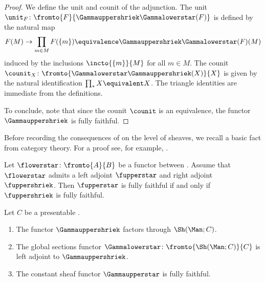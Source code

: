 \begin{proof}
	We define the unit and counit of the adjunction.
	The unit $ \unit_{F} \colon \fromto{F}{\Gammauppershriek \Gammalowerstar(F)} $ is defined by the natural map
	\begin{equation*}
		F(M) \to \prod_{m \in M} F(\{m\}) \equivalence \Gammauppershriek \Gammalowerstar(F)(M)
	\end{equation*}
	induced by the inclusions $ \incto{\{m\}}{M} $ for all $ m \in M $.
	The counit $ \counit_X \colon \fromto{\Gammalowerstar \Gammauppershriek(X)}{X} $ is given by the natural identification $ \prod_{*} X \equivalent X $.
	The triangle identities are immediate from the definitions.

	To conclude, note that since the counit $ \counit $ is an equivalence, the functor $ \Gammauppershriek $ is fully faithful.
\end{proof}

Before recording the consequences of  on the level of sheaves, we recall a basic fact from category theory.
For a proof see, for example, \cite[Chapter VII, \S4, Lemma 1]{MR1300636}.

\begin{lemma}\label{lem:ladjradj}
	Let $ \flowerstar \colon \fromto{A}{B} $ be a functor between \categories.
	Assume that $ \flowerstar $ admits a left adjoint $ \fupperstar $ and right adjoint $ \fuppershriek $.
	Then $ \fupperstar $ is fully faithful if and only if $ \fuppershriek $ is fully faithful.
\end{lemma}

\begin{corollary}\label{cor:GammauppershriekSh}
	Let $ C $ be a presentable \category.
	\begin{enumerate}
		\item\label{cor:GammauppershriekSh.1} The functor $ \Gammauppershriek $ factors through $ \Sh(\Man;C) $.

		\item\label{cor:GammauppershriekSh.2} The global sections functor $ \Gammalowerstar \colon \fromto{\Sh(\Man;C)}{C} $ is left adjoint to $ \Gammauppershriek $.
		
		\item\label{cor:GammauppershriekSh.3} The constant sheaf functor $ \Gammaupperstar $ is fully faithful.
	\end{enumerate}
\end{corollary}

